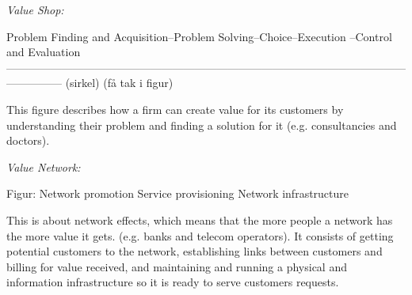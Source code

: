 \bigskip

\emph{Value Shop:}

Problem Finding and Acquisition--Problem Solving--Choice--Execution --Control and Evaluation
---------------------------------------------------------------------------------------------------------------------------
(sirkel) (få tak i figur)

This figure describes how a firm can create value for its customers by understanding their problem and finding a solution for it (e.g. consultancies and doctors).

\bigskip

\emph{Value Network:}

Figur: Network promotion
Service provisioning
Network infrastructure

This is about network effects, which means that the more people a network has the more value it gets. (e.g. banks and telecom operators). It consists of getting potential customers to the network, establishing links between customers and billing for value received, and maintaining and running a physical and information infrastructure so it is ready to serve customers requests. 